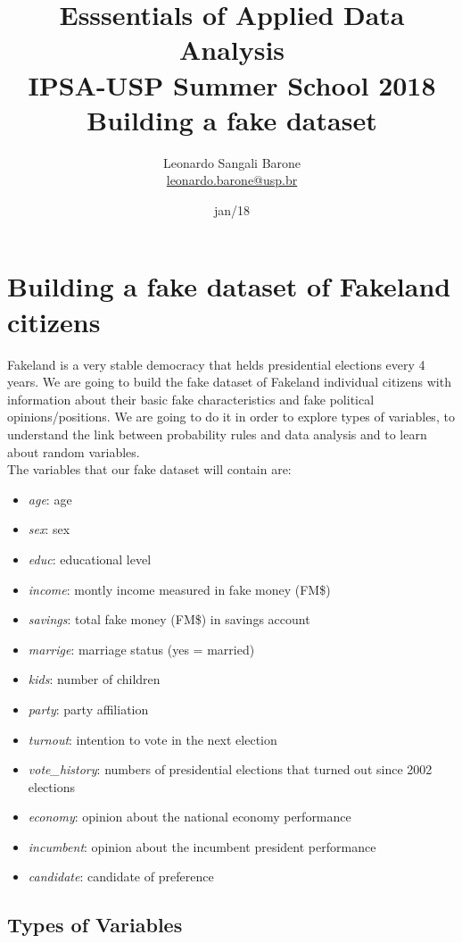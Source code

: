 \documentclass[11pt]{article}
\title{\textbf{Esssentials of Applied Data Analysis\\
				IPSA-USP Summer School 2018}\newline\\
				Building a fake dataset}
\author{Leonardo Sangali Barone\\ \href{leonardo.barone@usp.br}{leonardo.barone@usp.br}}
\date{jan/18}
\begin{document}
\maketitle

\section*{Building a fake dataset of Fakeland citizens}

	Fakeland is a very stable democracy that helds presidential elections every 4 years. We are going to build the fake dataset of Fakeland individual citizens with information about their basic fake characteristics and fake political opinions/positions. We are going to do it in order to explore types of variables, to understand the link between probability rules and data analysis and to learn about random variables.\\
	
	The variables that our fake dataset will contain are:
	
	\begin{itemize}

	\item \emph{age}: age
	\item \emph{sex}: sex
	\item \emph{educ}: educational level
	\item \emph{income}: montly income measured in fake money (FM\$)
	\item \emph{savings}: total fake money (FM\$) in savings account
	\item \emph{marrige}: marriage status (yes = married)
	\item \emph{kids}: number of children
	\item \emph{party}: party affiliation
	\item \emph{turnout}: intention to vote in the next election
	\item \emph{vote\_history}: numbers of presidential elections that turned out since 2002 elections
	\item \emph{economy}: opinion about the national economy performance
	\item \emph{incumbent}: opinion about the incumbent president performance
	\item \emph{candidate}: candidate of preference
	
	\end{itemize}
	
	\subsection*{Types of Variables}
\end{document}
